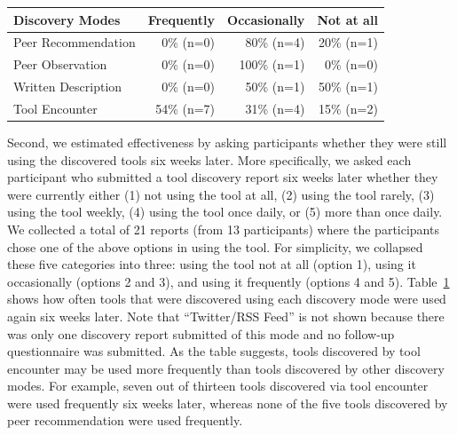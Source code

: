 \documentclass[smallextended]{svjour3}
\begin{document}
\begin{center}
\begin{table}[t]

\renewcommand{\arraystretch}{1.4} 

   \centering

	\label{tbl:reusing}
		
		
		\begin{tabularx}{100mm}{p{34mm}|r|r|r}
		\textbf{Discovery Modes}&\textbf{Frequently}&\textbf{Occasionally}&\textbf{Not at all}\\	
		\hline
    Peer Recommendation & 0\% (n=0)   & 80\% (n=4)  & 20\% (n=1)   \\\hline 
    Peer Observation    & 0\% (n=0)   & 100\% (n=1)   & 0\% (n=0)   \\\hline 
    Written Description & 0\% (n=0)   & 50\% (n=1)   & 50\% (n=1)   \\\hline 
    Tool Encounter      & 54\% (n=7)  & 31\% (n=4)   & 15\% (n=2)   \\ 		    
		\end{tabularx}
		
\end{table}
\end{center}

Second, we estimated effectiveness by asking participants whether
they were still using the discovered tools six weeks later.
More specifically, we asked each participant who submitted a tool discovery 
report six weeks later whether they were currently either 
(1) not using the tool at all, 
(2) using the tool rarely,
(3) using the tool weekly,
(4) using the tool once daily, or
(5) more than once daily.
We collected a total of 21 reports (from 13 participants) 
where the participants chose one of the above options in using the tool.
For simplicity, we collapsed these five categories into three:
using the tool not at all (option 1),
using it occasionally (options 2 and 3), and
using it frequently (options 4 and 5).
Table~\ref{tbl:reusing} shows how often tools that were discovered using 
each discovery mode were used again six weeks later.
Note that ``Twitter/RSS Feed'' is not shown because there was only one 
discovery report submitted of this mode and no follow-up questionnaire was submitted.
As the table suggests, tools discovered by tool encounter may be used more 
frequently than tools discovered by other discovery modes. 
For example, seven out of thirteen tools discovered via tool encounter 
were used frequently six weeks later, 
whereas none of the five tools discovered by peer recommendation were used frequently. 
\end{document}
